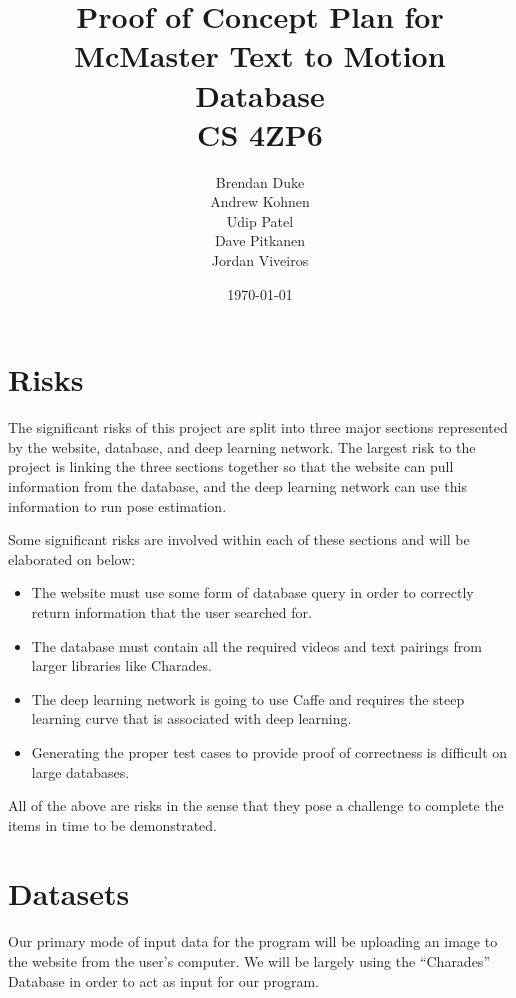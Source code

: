 \documentclass[a4paper, 12pt]{article}
\date{\today}
\title{Proof of Concept Plan for McMaster Text to Motion Database \\CS 4ZP6}
\author{Brendan Duke\\
        Andrew Kohnen\\
        Udip Patel\\
        Dave Pitkanen\\
        Jordan Viveiros}
\begin{document}
\maketitle

\section{Risks}
The significant risks of this project are split into three major sections
represented by the website, database, and deep learning network. The largest
risk to the project is linking the three sections together so that the website
can pull information from the database, and the deep learning network can use
this information to run pose estimation.

Some significant risks are involved within each of these sections and will be elaborated on below:

\begin{itemize}
    \item The website must use some form of database query in order to
            correctly return information that the user searched for.
    \item The database must contain all the required videos and text pairings
            from larger libraries like Charades.
    \item The deep learning network is going to use Caffe and requires the
            steep learning curve that is associated with deep learning.
    \item Generating the proper test cases to provide proof of correctness is
            difficult on large databases.
\end{itemize}

All of the above are risks in the sense that they pose a challenge to complete
the items in time to be demonstrated.

\section{Datasets}
{Our primary mode of input data for the program will be uploading an image to
the website from the user's computer. We will be largely using the ``Charades''
Database in order to act as input for our program.}
\end{document}
